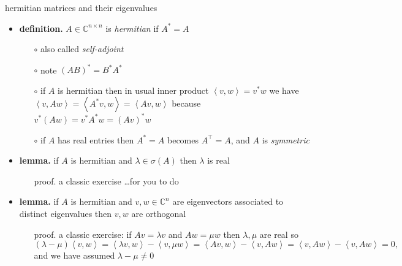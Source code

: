 \documentclass[10pt,hyperref]{beamer}
\newcommand{\CC}{\mathbb{C}}
\newcommand{\ip}[2]{\left<#1,#2\right>}
\begin{document}
\begin{frame}{hermitian matrices and their eigenvalues}

\begin{itemize}
\item \textbf{definition.} $A \in \CC^{n\times n}$ is \emph{hermitian} if $A^*=A$
    \begin{itemize}
    \item[$\circ$] also called \emph{self-adjoint}
    \item[$\circ$] note $(AB)^*=B^*A^*$
    \item[$\circ$] if $A$ is hermitian then in usual inner product $\ip{v}{w}=v^*w$ we have $\ip{v}{Aw} = \ip{A^* v}{w} = \ip{A v}{w}$ because $v^* (Aw) = v^* A^* w = (Av)^* w$
    \item[$\circ$] if $A$ has real entries then $A^*=A$ becomes $A^\top=A$, and $A$ is \emph{symmetric}
    \end{itemize}
\item \textbf{lemma.} if $A$ is hermitian and $\lambda \in \sigma(A)$ then $\lambda$ is real
    \begin{itemize}
    \item[proof.] a classic exercise \dots for you to do
    \end{itemize}
\item \textbf{lemma.} if $A$ is hermitian and $v,w \in \CC^n$ are eigenvectors associated to distinct eigenvalues then $v,w$ are orthogonal
    \begin{itemize}
    \item[proof.] a classic exercise: if $Av=\lambda v$ and $Aw=\mu w$ then $\lambda,\mu$ are real so
    $$(\lambda-\mu) \ip{v}{w} = \ip{\lambda v}{w} - \ip{v}{\mu w} = \ip{Av}{w} - \ip{v}{Aw} = \ip{v}{Aw} - \ip{v}{Aw} = 0,$$
and we have assumed $\lambda-\mu \ne 0$
    \end{itemize}
\end{itemize}
\end{frame}
\end{document}
